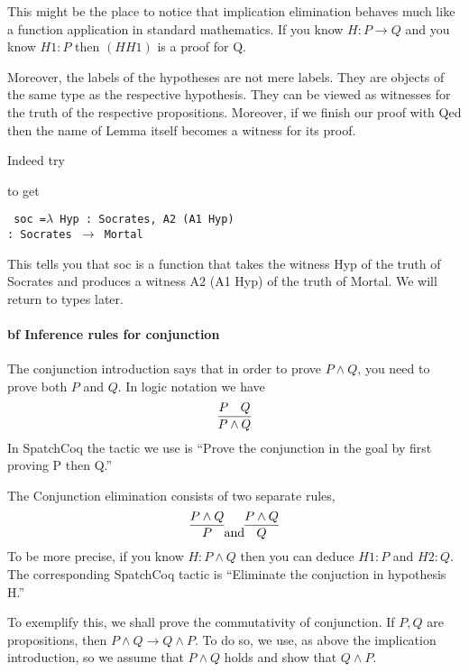 \begin{itemize}
 
\begin{tcolorbox}[colback=red!5!white,colframe=black]
This might be the place to notice that implication elimination behaves much like a function application in standard mathematics. If you know $H:P\rightarrow Q$  and you know $H1:P$ then $(H H1)$ is a proof for Q. 

Moreover, the labels of the hypotheses are not mere labels. They are objects of the same type as the respective hypothesis. They can be viewed as witnesses for the truth of the respective propositions. Moreover, if we finish our proof with Qed then the name of Lemma itself becomes a witness for its proof.

 
 \end{tcolorbox}
Indeed try

to get 

\texttt{
soc =$ \lambda$ Hyp : Socrates, A2 (A1 Hyp) \\
     : Socrates $\rightarrow$ Mortal}

This tells you  that soc is a function  that takes the witness Hyp of the truth of Socrates and produces a witness A2 (A1 Hyp) of the truth of Mortal.
 We will return to types later.





\paragraph{bf Inference rules for conjunction}
The conjunction introduction says that in order to prove $P\land Q$, you need to prove both $P$ and $Q$. In logic notation we have
$$\infer{P\land Q}{P & Q}$$
In SpatchCoq the tactic we use is ``Prove the conjunction in the goal by first proving P then Q.''

The Conjunction elimination consists of  two separate rules,
$$\infer{P}{P\land Q} \mbox{and} \infer{Q}{P\land Q}$$ To be more precise, if you know $H:P\land Q$ then you can deduce $H1:P$ and $H2:Q$. The corresponding SpatchCoq tactic is ``Eliminate the conjuction in hypothesis H.''

To exemplify this, we shall prove the commutativity of conjunction.
If $P,Q$ are propositions, then $P\land Q \rightarrow Q \land P$. To do so, we use, as above the implication introduction, so we assume that $P\land Q$ holds and show that $Q\land P$. 


\end{itemize}
